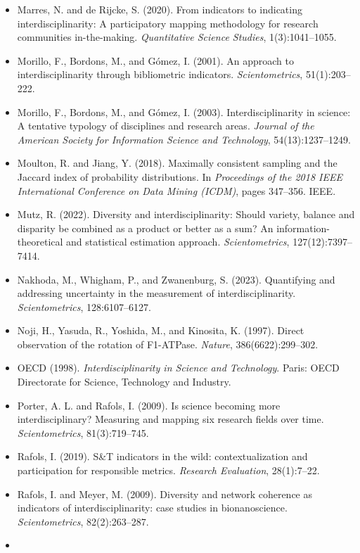 \documentclass[
]{article}
\begin{document}
\begin{itemize}
\item
  Marres, N. and de Rijcke, S. (2020). From indicators to indicating
  interdisciplinarity: A participatory mapping methodology for research
  communities in-the-making. \emph{Quantitative Science Studies},
  1(3):1041--1055.
\item
  Morillo, F., Bordons, M., and Gómez, I. (2001). An approach to
  interdisciplinarity through bibliometric indicators.
  \emph{Scientometrics}, 51(1):203--222.
\item
  Morillo, F., Bordons, M., and Gómez, I. (2003). Interdisciplinarity in
  science: A tentative typology of disciplines and research areas.
  \emph{Journal of the American Society for Information Science and
  Technology}, 54(13):1237--1249.
\item
  Moulton, R. and Jiang, Y. (2018). Maximally consistent sampling and
  the Jaccard index of probability distributions. In \emph{Proceedings
  of the 2018 IEEE International Conference on Data Mining (ICDM)},
  pages 347--356. IEEE.
\item
  Mutz, R. (2022). Diversity and interdisciplinarity: Should variety,
  balance and disparity be combined as a product or better as a sum? An
  information-theoretical and statistical estimation approach.
  \emph{Scientometrics}, 127(12):7397--7414.
\item
  Nakhoda, M., Whigham, P., and Zwanenburg, S. (2023). Quantifying and
  addressing uncertainty in the measurement of interdisciplinarity.
  \emph{Scientometrics}, 128:6107--6127.
\item
  Noji, H., Yasuda, R., Yoshida, M., and Kinosita, K. (1997). Direct
  observation of the rotation of F1-ATPase. \emph{Nature},
  386(6622):299--302.
\item
  OECD (1998). \emph{Interdisciplinarity in Science and Technology}.
  Paris: OECD Directorate for Science, Technology and Industry.
\item
  Porter, A. L. and Rafols, I. (2009). Is science becoming more
  interdisciplinary? Measuring and mapping six research fields over
  time. \emph{Scientometrics}, 81(3):719--745.
\item
  Rafols, I. (2019). S\&T indicators in the wild: contextualization and
  participation for responsible metrics. \emph{Research Evaluation},
  28(1):7--22.
\item
  Rafols, I. and Meyer, M. (2009). Diversity and network coherence as
  indicators of interdisciplinarity: case studies in bionanoscience.
  \emph{Scientometrics}, 82(2):263--287.
\item

\end{itemize}
\end{document}
